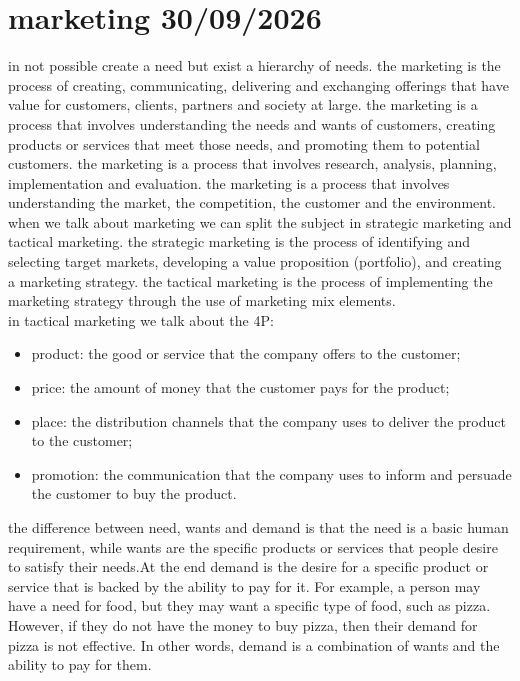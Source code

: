 \documentclass[12pt,a4paper]{report}
\begin{document}
\chapter{marketing 30/09/2026}
in not possible create a need but exist a hierarchy of needs. the marketing is the process of creating, communicating, delivering and exchanging offerings that have value for customers, clients, partners and society at large. the marketing is a process that involves understanding the needs and wants of customers, creating products or services that meet those needs, and promoting them to potential customers. the marketing is a process that involves research, analysis, planning, implementation and evaluation. the marketing is a process that involves understanding the market, the competition, the customer and the environment.
\\when we talk about marketing we can split the subject in strategic marketing and tactical marketing. the strategic marketing is the process of identifying and selecting target markets, developing a value proposition (portfolio), and creating a marketing strategy. the tactical marketing is the process of implementing the marketing strategy through the use of marketing mix elements.
\\in tactical marketing we talk about the 4P:
\begin{itemize}
    \item product: the good or service that the company offers to the customer;
    \item price: the amount of money that the customer pays for the product;
    \item place: the distribution channels that the company uses to deliver the product to the customer;
    \item promotion: the communication that the company uses to inform and persuade the customer to buy the product.
\end{itemize} 
the difference between need, wants and demand is that the need is a basic human requirement, while wants are the specific products or services that people desire to satisfy their needs.At the end demand is the desire for a specific product or service that is backed by the ability to pay for it. For example, a person may have a need for food, but they may want a specific type of food, such as pizza. However,
    if they do not have the money to buy pizza, then their demand for pizza is not effective. In other words, demand is a combination of wants and the ability to pay for them.
\end{document}
